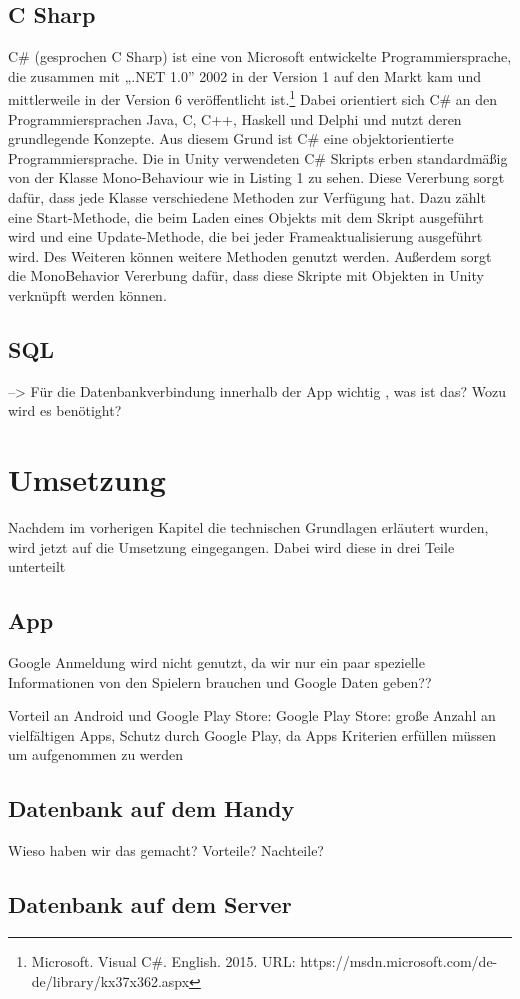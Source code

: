 \section{C Sharp}

C\# (gesprochen C Sharp) ist eine von Microsoft entwickelte Programmiersprache, die zusammen mit „.NET 1.0” 2002 in der Version 1 auf den Markt kam und mittlerweile in der Version 6 veröffentlicht ist.\footnote{Microsoft. Visual C\#. English. 2015. URL: https://msdn.microsoft.com/de-de/library/kx37x362.aspx} Dabei orientiert sich C\# an den Programmiersprachen Java, C, C++, Haskell und Delphi und nutzt deren grundlegende Konzepte. Aus diesem Grund ist C\# eine objektorientierte Programmiersprache. Die in Unity verwendeten C\# Skripts erben standardmäßig von der Klasse Mono-Behaviour wie in Listing 1 zu sehen. Diese Vererbung sorgt dafür, dass jede Klasse verschiedene Methoden zur Verfügung hat. Dazu zählt eine Start-Methode, die beim Laden eines Objekts mit dem Skript ausgeführt wird und eine Update-Methode, die bei jeder Frameaktualisierung ausgeführt wird. Des Weiteren können weitere Methoden genutzt werden. Außerdem sorgt die MonoBehavior Vererbung dafür, dass diese Skripte mit Objekten in Unity verknüpft werden können.

\section{SQL}

	--> Für die Datenbankverbindung innerhalb der App wichtig , was ist das? Wozu wird es benötight?


\chapter{Umsetzung}

	Nachdem im vorherigen Kapitel die technischen Grundlagen erläutert wurden, wird jetzt auf die Umsetzung eingegangen. Dabei wird diese in drei Teile unterteilt

\section{App}
	Google Anmeldung wird nicht genutzt, da wir nur ein paar spezielle Informationen von den Spielern brauchen und Google Daten geben??
	
	Vorteil an Android und Google Play Store: Google Play Store: große Anzahl an vielfältigen Apps, Schutz durch Google Play, da Apps Kriterien erfüllen müssen um aufgenommen zu werden

\section{Datenbank auf dem Handy}
	Wieso haben wir das gemacht? Vorteile? Nachteile?
	
\section{Datenbank auf dem Server}